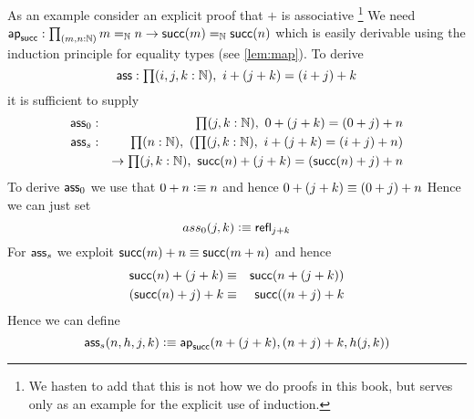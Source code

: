 As an example consider an explicit proof that $+$ is associative
\footnote{We hasten to add that this is not how we do proofs in this
  book, but serves only as an example for the explicit use of induction.}
We need $\apfunc{\suc} : \prd{m,n:\nat} m =_\nat n \to \suc(m) =_\nat \suc(n)$ which is easily derivable using the induction principle for equality types (see \autoref{lem:map}). To derive
\[\ass : \prd{i,j,k:\nat} i + (j + k) = (i + j) + k \]
it is sufficient to supply
\begin{align*}
  \ass_0 & : & \prd{j,k:\nat} 0 + (j + k) = (0+ j) + n \\
  \ass_s & : & \prd{n:\nat}(\prd{j,k:\nat} i + (j + k) = (i + j) + n) \\
  && \to \prd{j,k:\nat} \suc(n) + (j + k) = (\suc(n) + j) + n 
\end{align*}
To derive $\mathsf{ass}_0$ we use that $0+n \vcentcolon\equiv n$ and hence  $0 + (j + k) \equiv (0+ j) + n$ Hence we can just set
\[ ass_0(j,k) \vcentcolon\equiv \mathsf{refl}_{j+k} \]
For $\mathsf{ass}_s$ we exploit $\mathsf{succ}(m)+n \equiv \mathsf{succ}(m+n)$ and hence 
\begin{eqnarray*}
   \mathsf{succ}(n) + (j + k)  & \equiv & \mathsf{succ}(n+(j+k)) \\
   (\mathsf{succ}(n)+j)+k & \equiv & \mathsf{succ}((n+j)+k
\end{eqnarray*}
Hence we can define
\[\mathsf{ass}_s(n,h,j,k) \vcentcolon\equiv \mathsf{ap}_{\mathsf{succ}}(n+(j+k),(n+j)+k,h(j,k)) \]



